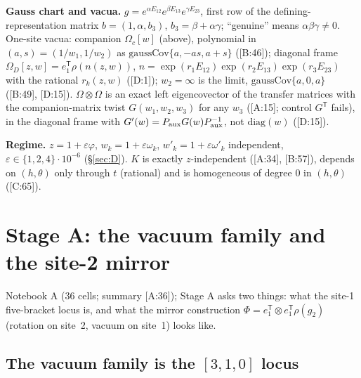 \documentclass[10pt]{article}
\newcommand{\cl}[2]{\textsf{[#1:#2]}}
\newcommand{\Om}{\Omega}
\begin{document}
\textbf{Gauss chart and vacua.} $g=e^{\alpha E_{12}}e^{\beta E_{13}}e^{\gamma E_{23}}$, first row of the defining-representation matrix $b=(1,\alpha,b_3)$, $b_3=\beta+\alpha\gamma$; ``genuine'' means $\alpha\beta\gamma\neq0$. One-site vacua: companion $\Om_c[w]$ (above), polynomial in $(a,s)=(1/w_1,1/w_2)$ as $\mathrm{gaussCov}\{a,-as,a+s\}$ (\cl{B}{46}); diagonal frame $\Om_D[z,w]=e_1^{\mathsf T}\rho(n(z,w))$, $n=\exp(r_1E_{12})\exp(r_2E_{13})\exp(r_3E_{23})$ with the rational $r_k(z,w)$ (\cl{D}{1}); $w_2=\infty$ is the limit, $\mathrm{gaussCov}\{a,0,a\}$ (\cl{B}{49}, \cl{D}{15}). $\Om\otimes\Om$ is an exact left eigencovector of the transfer matrices with the companion-matrix twist $G(w_1,w_2,w_3)$ for any $w_3$ (\cl{A}{15}; control $G^{\mathsf T}$ fails), in the diagonal frame with $G'(w)=P_{\rm aux}G(w)P_{\rm aux}^{-1}$, not $\mathrm{diag}(w)$ (\cl{D}{15}).

\textbf{Regime.} $z=1+\varepsilon\varphi$, $w_k=1+\varepsilon\omega_k$, $w'_k=1+\varepsilon\omega'_k$ independent, $\varepsilon\in\{1,2,4\}\cdot10^{-6}$ (\S\ref{sec:D}). $K$ is exactly $z$-independent (\cl{A}{34}, \cl{B}{57}), depends on $(h,\theta)$ only through $t$ (rational) and is homogeneous of degree 0 in $(h,\theta)$ (\cl{C}{65}).

\section{Stage A: the vacuum family and the site-2 mirror}\label{sec:A}

Notebook A (36 cells; summary \cl{A}{36}); Stage A asks two things: what the site-1 five-bracket locus is, and what the mirror construction $\Phi=e_1^{\mathsf T}\otimes e_1^{\mathsf T}\rho(g_2)$ (rotation on site~2, vacuum on site~1) looks like.

\subsection{The vacuum family is the $[3,1,0]$ locus}\label{sec:Avac}
\end{document}
